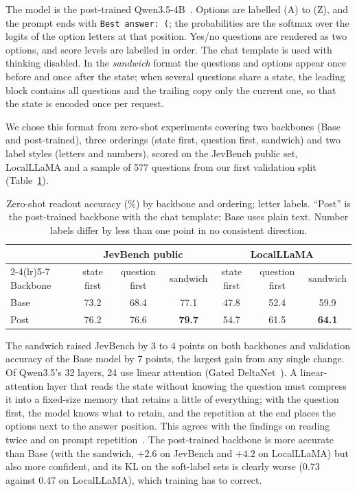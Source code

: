 \documentclass[10pt]{article}
\begin{document}
The model is the post-trained Qwen3.5-4B~\cite{qwen35}.
Options are labelled (A) to (Z), and the prompt ends with \texttt{Best answer: (}; the probabilities are the softmax over the logits of the option letters at that position.
Yes/no questions are rendered as two options, and score levels are labelled in order.
The chat template is used with thinking disabled.
In the \emph{sandwich} format the questions and options appear once before and once after the state; when several questions share a state, the leading block contains all questions and the trailing copy only the current one, so that the state is encoded once per request.

We chose this format from zero-shot experiments covering two backbones (Base and post-trained), three orderings (state first, question first, sandwich) and two label styles (letters and numbers), scored on the JevBench public set, LocalLLaMA and a sample of 577 questions from our first validation split (Table~\ref{tab:readout}).

\begin{table}[t]
\centering\small
\caption{Zero-shot readout accuracy (\%) by backbone and ordering; letter labels. ``Post'' is the post-trained backbone with the chat template; Base uses plain text. Number labels differ by less than one point in no consistent direction.}
\label{tab:readout}
\begin{tabular}{lcccccc}
\toprule
 & \multicolumn{3}{c}{JevBench public} & \multicolumn{3}{c}{LocalLLaMA} \\
\cmidrule(lr){2-4}\cmidrule(lr){5-7}
Backbone & state first & question first & sandwich & state first & question first & sandwich \\
\midrule
Base & 73.2 & 68.4 & 77.1 & 47.8 & 52.4 & 59.9 \\
Post & 76.2 & 76.6 & \textbf{79.7} & 54.7 & 61.5 & \textbf{64.1} \\
\bottomrule
\end{tabular}
\end{table}

The sandwich raised JevBench by 3 to 4 points on both backbones and validation accuracy of the Base model by 7 points, the largest gain from any single change.
Of Qwen3.5's 32 layers, 24 use linear attention (Gated DeltaNet~\cite{gdn}).
A linear-attention layer that reads the state without knowing the question must compress it into a fixed-size memory that retains a little of everything; with the question first, the model knows what to retain, and the repetition at the end places the options next to the answer position.
This agrees with the findings on reading twice and on prompt repetition~\cite{arora,leviathan}.
The post-trained backbone is more accurate than Base (with the sandwich, $+2.6$ on JevBench and $+4.2$ on LocalLLaMA) but also more confident, and its KL on the soft-label sets is clearly worse (0.73 against 0.47 on LocalLLaMA), which training has to correct.
\end{document}
